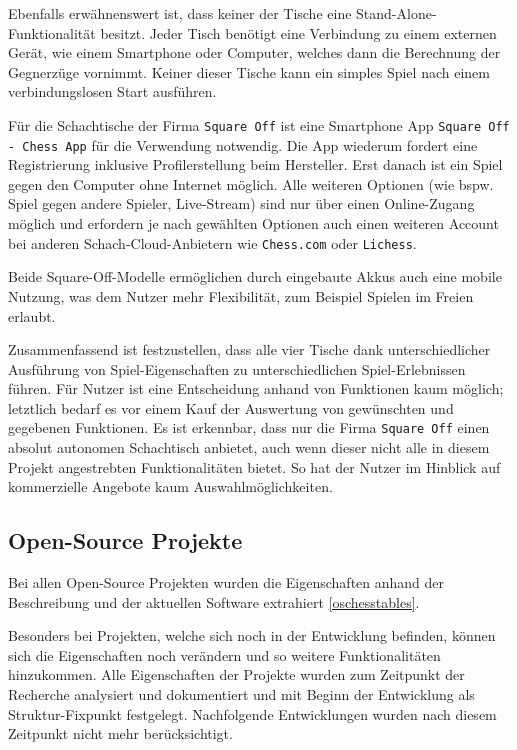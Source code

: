 Ebenfalls erwähnenswert ist, dass keiner der Tische eine
Stand-Alone-Funktionalität besitzt. Jeder Tisch benötigt eine Verbindung
zu einem externen Gerät, wie einem Smartphone oder Computer, welches
dann die Berechnung der Gegnerzüge vornimmt. Keiner dieser Tische kann
ein simples Spiel nach einem verbindungslosen Start ausführen.

Für die Schachtische der Firma \passthrough{\lstinline!Square Off!} ist
eine Smartphone App
\passthrough{\lstinline!Square Off - Chess App!}\cite{squareoffapp}
für die Verwendung notwendig. Die App wiederum fordert eine
Registrierung inklusive Profilerstellung beim Hersteller. Erst danach
ist ein Spiel gegen den Computer ohne Internet möglich. Alle weiteren
Optionen (wie bspw. Spiel gegen andere Spieler, Live-Stream) sind nur
über einen Online-Zugang möglich und erfordern je nach gewählten
Optionen auch einen weiteren Account bei anderen Schach-Cloud-Anbietern
wie \passthrough{\lstinline!Chess.com!} oder
\passthrough{\lstinline!Lichess!}.

Beide Square-Off-Modelle ermöglichen durch eingebaute Akkus auch eine
mobile Nutzung, was dem Nutzer mehr Flexibilität, zum Beispiel Spielen
im Freien erlaubt.

Zusammenfassend ist festzustellen, dass alle vier Tische dank
unterschiedlicher Ausführung von Spiel-Eigenschaften zu
unterschiedlichen Spiel-Erlebnissen führen. Für Nutzer ist eine
Entscheidung anhand von Funktionen kaum möglich; letztlich bedarf es vor
einem Kauf der Auswertung von gewünschten und gegebenen Funktionen. Es
ist erkennbar, dass nur die Firma \passthrough{\lstinline!Square Off!}
einen absolut autonomen Schachtisch anbietet, auch wenn dieser nicht
alle in diesem Projekt angestrebten Funktionalitäten bietet. So hat der
Nutzer im Hinblick auf kommerzielle Angebote kaum Auswahlmöglichkeiten.

\hypertarget{open-source-projekte}{%
\subsection{Open-Source Projekte}\label{open-source-projekte}}

Bei allen Open-Source Projekten wurden die Eigenschaften anhand der
Beschreibung und der aktuellen Software extrahiert \ref{oschesstables}.

Besonders bei Projekten, welche sich noch in der Entwicklung befinden,
können sich die Eigenschaften noch verändern und so weitere
Funktionalitäten hinzukommen. Alle Eigenschaften der Projekte wurden zum
Zeitpunkt der Recherche analysiert und dokumentiert und mit Beginn der
Entwicklung als Struktur-Fixpunkt festgelegt. Nachfolgende Entwicklungen
wurden nach diesem Zeitpunkt nicht mehr berücksichtigt.

